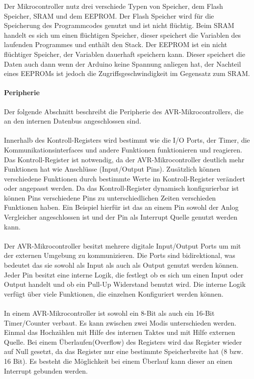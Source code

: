 Der Mikrocontroller nutz drei verschiede Typen von Speicher, dem Flash Speicher, SRAM und dem EEPROM. Der Flash Speicher wird für die Speicherung des Programmcodes genutzt und ist nicht flüchtig. Beim SRAM handelt es sich um einen flüchtigen Speicher, dieser speichert die Variablen des laufenden Programmes und enthält den Stack. Der EEPROM ist ein nicht flüchtiger Speicher, der Variablen dauerhaft speichern kann. Dieser speichert die Daten auch dann wenn der Arduino keine Spannung anliegen hat, der Nachteil eines EEPROMs ist jedoch die Zugriffsgeschwindigkeit im Gegensatz zum SRAM.
\paragraph{Peripherie}
Der folgende Abschnitt beschreibt die Peripherie des AVR-Mikrocontrollers, die an den internen Datenbus angeschlossen sind.
\paragraph{}
Innerhalb des Kontroll-Registers wird bestimmt wie die I/O Ports, der Timer, die Kommunikationsinterfaces und andere Funktionen funktionieren und reagieren. Das Kontroll-Register ist notwendig, da der AVR-Mikrocontroller deutlich mehr Funktionen hat wie Anschlüsse (Input/Output Pins). Zusätzlich können verschiedene Funktionen durch bestimmte Werte im Kontroll-Register verändert oder angepasst werden. Da das Kontroll-Register dynamisch konfigurierbar ist können Pins verschiedene Pins zu unterschiedlichen Zeiten verschieden Funktionen haben. Ein Beispiel hierfür ist das an einem Pin sowohl der Anlog Vergleicher angeschlossen ist und der Pin als Interrupt Quelle genutzt werden kann.
\paragraph{}
Der AVR-Mikrocontroller besitzt mehrere digitale Input/Output Ports um mit der externen Umgebung zu kommunizieren. Die Ports sind bidirektional, was bedeutet das sie sowohl als Input als auch als Output genutzt werden können. Jeder Pin besitzt eine interne Logik, die festlegt ob es sich um einen Input oder Output handelt und ob ein Pull-Up Widerstand benutzt wird. Die interne Logik verfügt über viele Funktionen, die einzelnen Konfiguriert werden können.
\paragraph{}
In einem AVR-Mikrocontroller ist sowohl ein 8-Bit als auch ein 16-Bit Timer/Counter verbaut. Es kann zwischen zwei Modis unterschieden werden. Einmal das Hochzählen mit Hilfe des internen Taktes und mit Hilfe externen Quelle. Bei einem Überlaufen(Overflow) des Registers wird das Register wieder auf Null gesetzt, da das Register nur eine bestimmte Speicherbreite hat (8 bzw. 16 Bit). Es besteht die Möglichkeit bei einem Überlauf kann dieser an einen Interrupt gebunden werden. 
